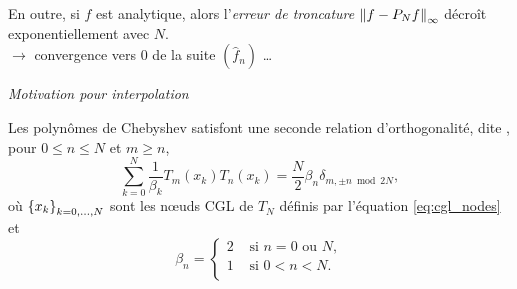 En outre, si $f$ est analytique, alors l'\textit{erreur de troncature} $\norminf{f - \truncseries{f}{N}}$ décroît exponentiellement avec $N$. %
\\
$\to$ convergence vers 0 de la suite $(\hat{f}_n)$ \ldots
\par\bigskip
\textit{Motivation pour interpolation}

Les polynômes de Chebyshev satisfont une seconde relation d'orthogonalité, dite , pour $0 \leq n \leq N$ et $m \geq n$,
\begin{equation}
	\sum_{k=0}^{N} \frac{1}{\beta_k} T_m(x_k) T_n(x_k) = 
	\frac{N}{2} \beta_n \delta_{m,\pm n \bmod{2N}},
	\label{eq:chebyshev_discrete_orthogonality}
\end{equation}
où $\family{x}{k}{0}{N}$ sont les n\oe uds CGL de $T_N$ définis par l'équation \eqref{eq:cgl_nodes} et
\begin{equation}
	\beta_n = 
	\begin{cases}
	 2 & \text{\ si\ } n = 0 \text{\ ou\ } N,   \\ 
	 1 & \text{\ si\ } 0 < n < N.\\ 
	\end{cases}
\end{equation}

